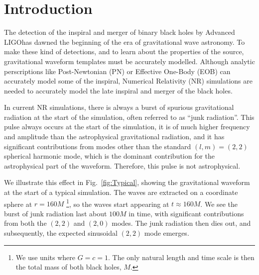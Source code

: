 \section{Introduction}
The detection of the inspiral and merger of binary black holes by
Advanced
LIGO has
dawned the beginning of the era of gravitational wave astronomy. To
make these kind of detections, and to learn about the properties of
the source, gravitational waveform templates must be accurately
modelled. Although analytic perscriptions like Post-Newtonian (PN)
 or Effective One-Body (EOB)
 can accurately model some of the inspiral,
Numerical Relativity (NR) simulations are needed to accurately model
the late inspiral and merger of the black holes.

In current NR simulations, there is always a burst of spurious
gravitational radiation at the start of the simulation, often referred to as
``junk radiation''. This pulse
always occurs at the start of the simulation, it is of much higher frequency and amplitude
than the astrophysical gravitational radiation, and it has significant
contributions from modes other than the standard $(l,m) = (2,2)$
spherical harmonic mode, which is the dominant contribution for the
astrophysical part of the waveform.  Therefore, this pulse is not astrophysical.

We illustrate this effect in Fig.~\ref{fig:Typical}, showing the
gravitational waveform  at the start of a
typical simulation. The waves are extracted on a coordinate sphere at
$r=160M$ \footnote{We use units where $G=c=1$. The only natural length
  and time scale is then the total mass of both black holes, $M$.}, so
the waves start appearing at $t\approx 160M$. We see the burst of junk
radiation last about $100M$ in time, with significant contributions
from both the $(2,2)$ and $(2,0)$ modes. The junk radiation then dies out,
and subsequently, the expected sinusoidal $(2,2)$ mode emerges.

